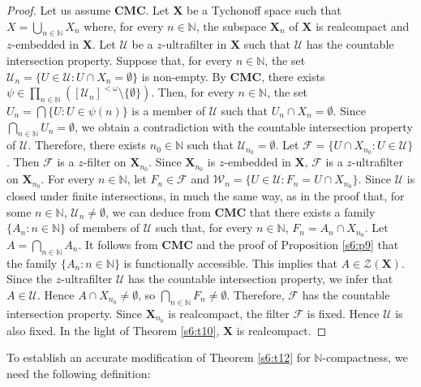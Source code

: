 \documentclass[12pt,twoside,leqno]{article}
\theoremstyle{plain}
\theoremstyle{definition}
\theoremstyle{remark}
\begin{document}
\begin{proof}
	Let us assume $\mathbf{CMC}$. Let $\mathbf{X}$ be a Tychonoff space such that $X=\bigcup\limits_{n\in\mathbb{N}}X_n$ where, for every $n\in\mathbb{N}$, the subspace $\mathbf{X}_n$ of $\mathbf{X}$ is realcompact and $z$-embedded in $\mathbf{X}$. Let $\mathcal{U}$ be a $z$-ultrafilter in $\mathbf{X}$ such that $\mathcal{U}$ has the countable intersection property. Suppose that, for every $n\in\mathbb{N}$, the set $\mathcal{U}_n=\{U\in\mathcal{U}: U\cap X_n=\emptyset\}$ is non-empty. By $\mathbf{CMC}$, there exists $\psi\in\prod\limits_{n\in\mathbb{N}}([\mathcal{U}_n]^{<\omega}\setminus\{\emptyset\})$. Then, for every $n\in\mathbb{N}$, the set $U_n=\bigcap\{U: U\in\psi(n)\}$ is a member of $\mathcal{U}$ such that $U_n\cap X_n=\emptyset$. Since $\bigcap\limits_{n\in\mathbb{N}}U_n=\emptyset$, we obtain a contradiction with the countable intersection property of $\mathcal{U}$. Therefore, there exists $n_0\in\mathbb{N}$ such that $\mathcal{U}_{n_0}=\emptyset$. Let $\mathcal{F}=\{U\cap X_{n_0}: U\in\mathcal{U}\}$. Then $\mathcal{F}$ is a $z$-filter on $\mathbf{X}_{n_0}$. Since $\mathbf{X}_{n_0}$ is $z$-embedded in $\mathbf{X}$, $\mathcal{F}$ is a $z$-ultrafilter on $\mathbf{X}_{n_0}$. For every $n\in\mathbb{N}$, let $F_n\in\mathcal{F}$ and $\mathcal{W}_n=\{U\in\mathcal{U}: F_n=U\cap X_{n_0}\}$. Since $\mathcal{U}$ is closed under finite intersections, in much the same way,  as in the proof that, for some $n\in\mathbb{N}$,  $\mathcal{U}_n\neq\emptyset$, we can deduce from $\mathbf{CMC}$ that there exists a family $\{A_n: n\in\mathbb{N}\}$ of members of $\mathcal{U}$ such that, for every $n\in\mathbb{N}$, $F_n=A_n\cap X_{n_0}$. Let $A=\bigcap\limits_{n\in\mathbb{N}}A_n$.  It follows from $\mathbf{CMC}$ and the proof of Proposition \ref{s6:p9} that the family $\{A_n: n\in\mathbb{N}\}$ is functionally accessible. This implies that $A\in\mathcal{Z}(\mathbf{X})$.  Since the $z$-ultrafilter $\mathcal{U}$ has the countable intersection property, we infer that $A\in\mathcal{U}$. Hence $A\cap X_{n_0}\neq\emptyset$, so $\bigcap\limits_{n\in\mathbb{N}}F_n\neq\emptyset$. Therefore, $\mathcal{F}$ has the countable intersection property. Since $\mathbf{X}_{n_0}$ is realcompact, the filter $\mathcal{F}$ is fixed. Hence $\mathcal{U}$ is also fixed. In the light of Theorem \ref{s6:t10}, $\mathbf{X}$ is realcompact.
\end{proof}

To establish an accurate modification of Theorem  \ref{s6:t12} for $\mathbb{N}$-compactness, we need the following definition:
\end{document}
